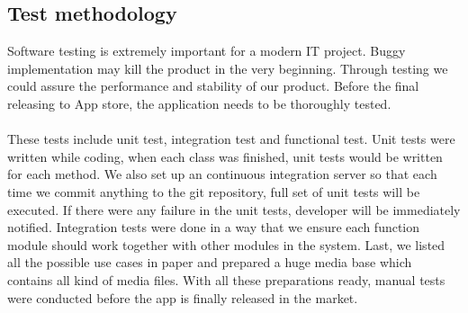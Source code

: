 \subsection{Test methodology}
Software testing is extremely important for a modern IT project. Buggy implementation may kill the product in the very beginning. Through testing we could assure the performance and stability of our product. Before the final releasing to App store, the application needs to be thoroughly tested.\\
\\
These tests include unit test, integration test and functional test.
Unit tests were written while coding, when each class was finished, unit tests would be written for each method. We also set up an continuous integration server so that each time we commit anything to the git repository, full set of unit tests will be executed. If there were any failure in the unit tests, developer will be immediately notified. Integration tests were done in a way that we ensure each function module should work together with other modules in the system. Last, we listed all the possible use cases in paper and prepared a huge media base which contains all kind of media files. With all these preparations ready, manual tests were conducted before the app is finally released in the market.

